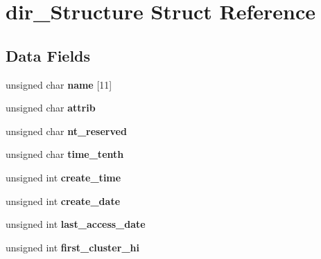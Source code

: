 \hypertarget{structdir___structure}{\section{dir\-\_\-\-Structure Struct Reference}
\label{structdir___structure}
}
\subsection*{Data Fields}
\begin{DoxyCompactItemize}
\item 
\hypertarget{structdir___structure_a232deea8738c944b02819f46c079ff46}{unsigned char {\bfseries name} \mbox{[}11\mbox{]}}\label{structdir___structure_a232deea8738c944b02819f46c079ff46}

\item 
\hypertarget{structdir___structure_aef3b5f04e6ef7e776d127f0bf43e5c14}{unsigned char {\bfseries attrib}}\label{structdir___structure_aef3b5f04e6ef7e776d127f0bf43e5c14}

\item 
\hypertarget{structdir___structure_abb926ae9fc3d074d077c616e0fd06f48}{unsigned char {\bfseries nt\-\_\-reserved}}\label{structdir___structure_abb926ae9fc3d074d077c616e0fd06f48}

\item 
\hypertarget{structdir___structure_a1a66f822c59d053084935df3ff810c78}{unsigned char {\bfseries time\-\_\-tenth}}\label{structdir___structure_a1a66f822c59d053084935df3ff810c78}

\item 
\hypertarget{structdir___structure_a91f5e03bd8cb732e329e968c8607fc2b}{unsigned int {\bfseries create\-\_\-time}}\label{structdir___structure_a91f5e03bd8cb732e329e968c8607fc2b}

\item 
\hypertarget{structdir___structure_a1576f22f8ccfd3c23404a3955b6e4773}{unsigned int {\bfseries create\-\_\-date}}\label{structdir___structure_a1576f22f8ccfd3c23404a3955b6e4773}

\item 
\hypertarget{structdir___structure_a191d87f0f5f41356a77c97f80a14877a}{unsigned int {\bfseries last\-\_\-access\-\_\-date}}\label{structdir___structure_a191d87f0f5f41356a77c97f80a14877a}

\item 
\hypertarget{structdir___structure_a235b35741d8bcbf56d2d08eed64acff6}{unsigned int {\bfseries first\-\_\-cluster\-\_\-hi}}\label{structdir___structure_a235b35741d8bcbf56d2d08eed64acff6}


\end{DoxyCompactItemize}
